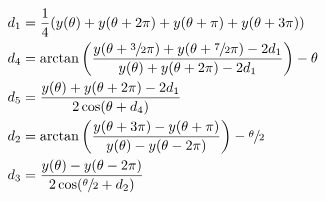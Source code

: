 \begin{subequations}
    \label{eq:constants}
    \begin{align}
        d_1 &= \frac14 (y(\theta) + y(\theta + 2\pi) + y(\theta + \pi) + y(\theta + 3\pi))
            \label{eq:constants-d1}\\
        d_4 &= \arctan\left(\frac{y(\theta + \sfrac32 \pi) + y(\theta + \sfrac72 \pi) - 2 d_1}{y(\theta) + y(\theta + 2\pi) - 2 d_1}\right) - \theta
            \label{eq:constants-d4}\\
        d_5 &= \frac{y(\theta) + y(\theta + 2\pi) - 2 d_1}{2 \cos(\theta + d_4)}
            \label{eq:constants-d5}\\
        d_2 &= \arctan\left(\frac{y(\theta + 3\pi) - y(\theta + \pi)}{y(\theta) - y(\theta - 2\pi)}\right) - \sfrac\theta2
            \label{eq:constants-d2}\\
        d_3 &= \frac{y(\theta) - y(\theta - 2\pi)}{2 \cos(\sfrac\theta2 + d_2)}
            \label{eq:constants-d3}
    \end{align}
\end{subequations}
